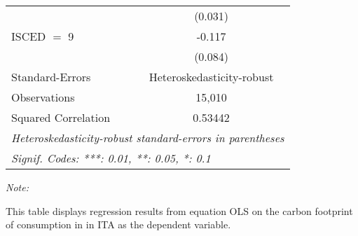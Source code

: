 \begin{table}[htbp!]
\begin{adjustbox}{width = 1\textwidth, max height = 0.95\textheight, center}
\begin{threeparttable}[b]
\begin{tabular}{lc}
                                & (0.031)\\   
            ISCED $=$ 9         & -0.117\\   
                                & (0.084)\\   
            \midrule 
            Standard-Errors     & Heteroskedasticity-robust \\   
            Observations        & 15,010\\  
            Squared Correlation & 0.53442\\  
            \midrule \midrule
            \multicolumn{2}{l}{\emph{Heteroskedasticity-robust standard-errors in parentheses}}\\
            \multicolumn{2}{l}{\emph{Signif. Codes: ***: 0.01, **: 0.05, *: 0.1}}\\
         \end{tabular}
         
         \begin{tablenotes}\item \medskip \textit{Note:}
            \item This table displays regression results from equation OLS on the carbon footprint of consumption in  in ITA as the dependent variable.  
         \end{tablenotes}
      \end{threeparttable}
   \end{adjustbox}
\end{table}


